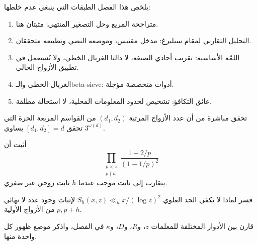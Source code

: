 يلخص هذا الفصل الطبقات التي ينبغي عدم خلطها:
\begin{enumerate}
  \item متراجحة المربع وحل التصغير المنتهي: مثبتان هنا.
  \item التحليل التقاربي لمقام سيلبرغ: مدخل مقتبس، وموضعه النصي وتطبيعه متحققان.
  \item اللمّة الأساسية: تقريب أحادي الصيغة، لا دالتا الغربال الخطي، ولا تُستعمل
  في تطبيق الأزواج الحالي.
  \item الغربال الخطي والـ\textenglish{beta-sieve}: أدوات متخصصة مؤجلة.
  \item عائق التكافؤ: تشخيص لحدود المعلومات المحلية، لا استحالة مطلقة.
\end{enumerate}

\begin{exercise}
تحقق مباشرة من أن عدد الأزواج المرتبة \((d_1,d_2)\) من القواسم المربعة الحرة
التي تحقق \([d_1,d_2]=d\) يساوي \(3^{\omega(d)}\).
\end{exercise}

\begin{exercise}
أثبت أن
\[
\prod_{\substack{p<z\\p\nmid h}}
\frac{1-2/p}{(1-1/p)^2}
\]
يتقارب إلى ثابت موجب عندما \(h\) ثابت زوجي غير صفري.
\end{exercise}

\begin{exercise}
فسر لماذا لا يكفي الحد العلوي
\(S_h(x,z)\ll_h x/(\log z)^2\) لإثبات وجود عدد لا نهائي من الأزواج الأولية
\(p,p+h\).
\end{exercise}

\begin{exercise}
قارن بين الأدوار المختلفة للمعلمات \(z\)، و\(R\)، و\(D\)، و\(\kappa\) في
الفصل، واذكر موضع ظهور كل واحدة منها.
\end{exercise}
